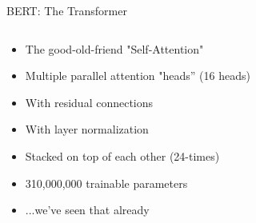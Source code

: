 \documentclass[12pt,aspectratio=169,handout]{beamer}
\begin{document}
\begin{frame}{BERT: The Transformer}
	
	\begin{columns}
		\begin{column}{0.6\linewidth}
			\begin{itemize}
				\item The good-old-friend "Self-Attention"
				\item Multiple parallel attention "heads” (16 heads)
				\item With residual connections
				\item With layer normalization
				\item Stacked on top of each other (24-times)
				\item 310,000,000 trainable parameters
				\item ...we've seen that already
			\end{itemize}
		\end{column}
		\begin{column}{0.3\linewidth}
			\begin{figure}

\end{figure}
\end{column}
\end{columns}
\end{frame}
\end{document}

